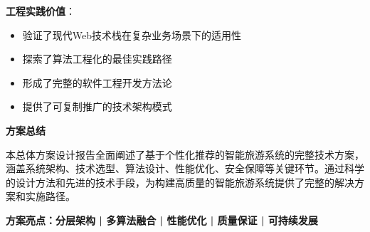\documentclass[12pt,a4paper]{article}
\begin{document}
\textbf{工程实践价值}：
\begin{itemize}
    \item 验证了现代Web技术栈在复杂业务场景下的适用性
    \item 探索了算法工程化的最佳实践路径
    \item 形成了完整的软件工程开发方法论
    \item 提供了可复制推广的技术架构模式
\end{itemize}



\vfill

\begin{center}
\begin{tcolorbox}[
    colback=primary,
    coltext=white,
    halign=center,
    rounded corners=10pt,
    drop shadow,
    width=0.95\textwidth
]
\textbf{\LARGE 方案总结}\\[0.5cm]

\begin{minipage}{0.9\textwidth}
\centering
本总体方案设计报告全面阐述了基于个性化推荐的智能旅游系统的完整技术方案，涵盖系统架构、技术选型、算法设计、性能优化、安全保障等关键环节。通过科学的设计方法和先进的技术手段，为构建高质量的智能旅游系统提供了完整的解决方案和实施路径。

\vspace{0.3cm}

\textcolor{accent}{\textbf{方案亮点：分层架构 | 多算法融合 | 性能优化 | 质量保证 | 可持续发展}}
\end{minipage}
\end{tcolorbox}
\end{center}
\end{document}
